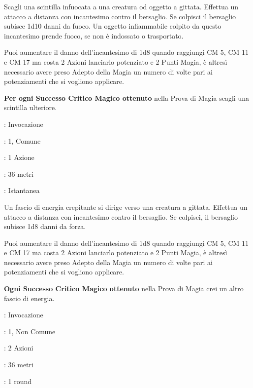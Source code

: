 \begin{multicols}{2}
Scagli una scintilla infuocata a una creatura od oggetto a gittata. Effettua un attacco a distanza con incantesimo contro il bersaglio. Se colpisci il bersaglio subisce 1d10 danni da fuoco. Un oggetto infiammabile colpito da questo incantesimo prende fuoco, se non è indossato o trasportato.

Puoi aumentare il danno dell'incantesimo di 1d8 quando raggiungi CM 5, CM 11 e CM 17 ma costa 2 Azioni lanciarlo potenziato e 2 Punti Magia, è altresì necessario avere preso Adepto della Magia un numero di volte pari ai potenziamenti che si vogliono applicare.

\textbf{Per ogni Successo Critico Magico ottenuto} nella Prova di Magia scagli una scintilla ulteriore.

\noindent\colorbox{OBSSgold!10}{
\begin{minipage}{0.95\linewidth}
\begin{description}[noitemsep, topsep=0pt, parsep=0pt, partopsep=0pt, leftmargin=0cm, labelwidth=1.3cm]
	\item[\textbf{Lista}]: Invocazione
	\item[\textbf{Livello}]: 1, Comune
	\item[\textbf{Lancio}]: 1 Azione
	\item[\textbf{Gittata}]: 36 metri
	\item[\textbf{Durata}]: Istantanea
\end{description}
\end{minipage}}\smallskip

Un fascio di energia crepitante si dirige verso una creatura a gittata. Effettua un attacco a distanza con incantesimo contro il bersaglio. Se colpisci, il bersaglio subisce 1d8 danni da forza.

Puoi aumentare il danno dell'incantesimo di 1d8 quando raggiungi CM 5, CM 11 e CM 17 ma costa 2 Azioni lanciarlo potenziato e 2 Punti Magia, è altresì necessario avere preso Adepto della Magia un numero di volte pari ai potenziamenti che si vogliono applicare.

\textbf{Ogni Successo Critico Magico ottenuto} nella Prova di Magia crei un altro fascio di energia.

\noindent\colorbox{OBSSgold!10}{
\begin{minipage}{0.95\linewidth}
\begin{description}[noitemsep, topsep=0pt, parsep=0pt, partopsep=0pt, leftmargin=0cm, labelwidth=1.3cm]
	\item[\textbf{Lista}]: Invocazione
	\item[\textbf{Livello}]: 1, Non Comune
	\item[\textbf{Lancio}]: 2 Azioni
	\item[\textbf{Gittata}]: 36 metri
	\item[\textbf{Durata}]: 1 round
\end{description}
\end{minipage}}\smallskip


\end{multicols}
